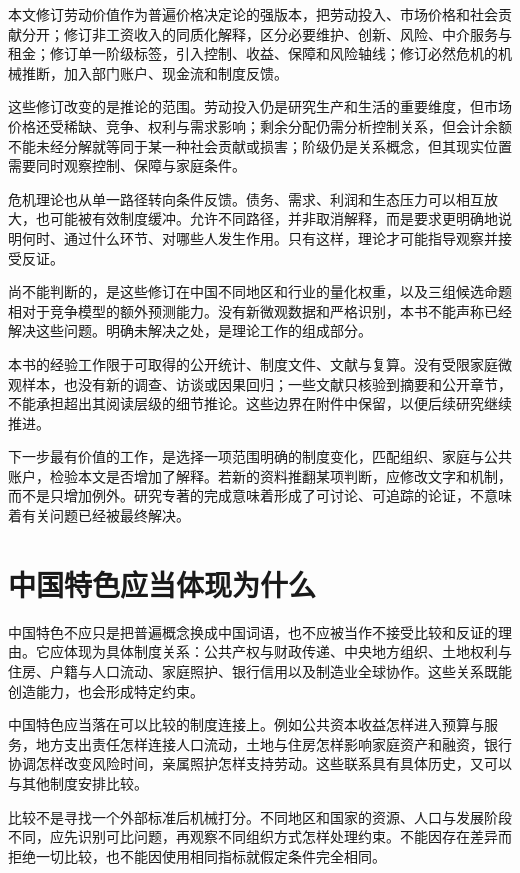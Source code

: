 \documentclass[UTF8,fontset=fandol,zihao=-4,oneside,openany]{ctexbook}
\begin{document}
本文修订劳动价值作为普遍价格决定论的强版本，把劳动投入、市场价格和社会贡献分开；修订非工资收入的同质化解释，区分必要维护、创新、风险、中介服务与租金；修订单一阶级标签，引入控制、收益、保障和风险轴线；修订必然危机的机械推断，加入部门账户、现金流和制度反馈。

\label{arg:P286}
这些修订改变的是推论的范围。劳动投入仍是研究生产和生活的重要维度，但市场价格还受稀缺、竞争、权利与需求影响；剩余分配仍需分析控制关系，但会计余额不能未经分解就等同于某一种社会贡献或损害；阶级仍是关系概念，但其现实位置需要同时观察控制、保障与家庭条件。

危机理论也从单一路径转向条件反馈。债务、需求、利润和生态压力可以相互放大，也可能被有效制度缓冲。允许不同路径，并非取消解释，而是要求更明确地说明何时、通过什么环节、对哪些人发生作用。只有这样，理论才可能指导观察并接受反证。

尚不能判断的，是这些修订在中国不同地区和行业的量化权重，以及三组候选命题相对于竞争模型的额外预测能力。没有新微观数据和严格识别，本书不能声称已经解决这些问题。明确未解决之处，是理论工作的组成部分。

\label{arg:P287}
本书的经验工作限于可取得的公开统计、制度文件、文献与复算。没有受限家庭微观样本，也没有新的调查、访谈或因果回归；一些文献只核验到摘要和公开章节，不能承担超出其阅读层级的细节推论。这些边界在附件中保留，以便后续研究继续推进。

下一步最有价值的工作，是选择一项范围明确的制度变化，匹配组织、家庭与公共账户，检验本文是否增加了解释。若新的资料推翻某项判断，应修改文字和机制，而不是只增加例外。研究专著的完成意味着形成了可讨论、可追踪的论证，不意味着有关问题已经被最终解决。

\section*{中国特色应当体现为什么}
中国特色不应只是把普遍概念换成中国词语，也不应被当作不接受比较和反证的理由。它应体现为具体制度关系：公共产权与财政传递、中央地方组织、土地权利与住房、户籍与人口流动、家庭照护、银行信用以及制造业全球协作。这些关系既能创造能力，也会形成特定约束。

\label{arg:P288}
中国特色应当落在可以比较的制度连接上。例如公共资本收益怎样进入预算与服务，地方支出责任怎样连接人口流动，土地与住房怎样影响家庭资产和融资，银行协调怎样改变风险时间，亲属照护怎样支持劳动。这些联系具有具体历史，又可以与其他制度安排比较。

比较不是寻找一个外部标准后机械打分。不同地区和国家的资源、人口与发展阶段不同，应先识别可比问题，再观察不同组织方式怎样处理约束。不能因存在差异而拒绝一切比较，也不能因使用相同指标就假定条件完全相同。
\end{document}
